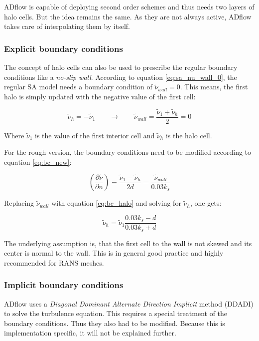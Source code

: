 ADflow is capable of deploying second order schemes and thus needs two layers of
halo cells. But the idea remains the same. As they are not always active, ADflow
takes care of interpolating them by itself.

\subsubsection{Explicit boundary conditions}
The concept of halo cells can also be used to prescribe the regular boundary
conditions like a \textit{no-slip wall}. According to equation
\ref{eq:sa_nu_wall_0}, the regular SA model needs a boundary condition of
$\tilde \nu_{wall} = 0$. This means, the first halo is simply updated with the
negative value of the first cell:

\begin{equation}
  \tilde \nu_{h} = - \tilde \nu_{1} \qquad \rightarrow \qquad
  \tilde \nu_{wall} = \frac{\tilde \nu_{1} + \tilde \nu_{h}}{2} = 0
  \label{eq:bc_halo}
\end{equation}

\noindent Where $\tilde \nu_{1}$ is the value of the first interior cell and
$\tilde \nu_{h}$ is the halo cell.

For the rough version, the boundary conditions need to be modified according to
equation \ref{eq:bc_new}:

\begin{equation}
  \left( \frac{\partial \tilde \nu}{\partial n} \right) \equiv
  \frac{\tilde \nu_{1} - \tilde \nu_{h}}{2d} =
  \frac{\tilde \nu_{wall}}{0.03 k_{s}}
\end{equation}

\noindent Replacing $\tilde \nu_{wall}$ with equation \ref{eq:bc_halo} and
solving for $\tilde \nu_{h}$, one gets:

\begin{equation}
  \tilde \nu_{h} = \tilde \nu_{1} \frac{0.03 k_{s} - d}{0.03 k_{s} + d}
\end{equation}

\noindent The underlying assumption is, that the first cell to the wall is not
skewed and its center is normal to the wall. This is in general good practice
and highly recommended for RANS meshes.


\subsubsection{Implicit boundary conditions}
ADflow uses a \textit{Diagonal Dominant Alternate Direction Implicit} method
(DDADI) to solve the turbulence equation. This requires a special treatment of
the boundary conditions. Thus they also had to be modified. Because this is
implementation specific, it will not be explained further.

